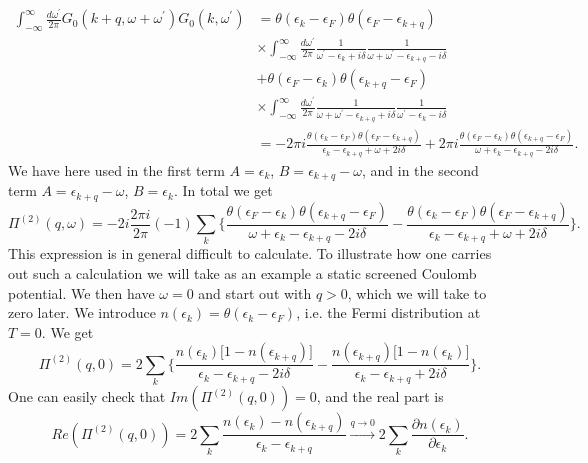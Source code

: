 \begin{align*}
\int_{-\infty}^{\infty}\frac{d\omega^{\prime}}{2\pi}G_0(k+q,\omega+\omega^{\prime})G_0(k,\omega^{\prime})&=\theta(\epsilon_k-\epsilon_F)\theta(\epsilon_F-\epsilon_{k+q})\\
&\times\int_{-\infty}^{\infty}\frac{d\omega^{\prime}}{2\pi}\frac{1}{\omega^{\prime}-\epsilon_k+i\delta}\frac{1}{\omega+\omega^{\prime}-\epsilon_{k+q}-i\delta}\\
&+\theta(\epsilon_F-\epsilon_k)\theta(\epsilon_{k+q}-\epsilon_F)\\
&\times\int_{-\infty}^{\infty}\frac{d\omega^{\prime}}{2\pi}\frac{1}{\omega+\omega^{\prime}-\epsilon_{k+q}+i\delta}\frac{1}{\omega^{\prime}-\epsilon_k-i\delta}\\
&=-2\pi i\frac{\theta(\epsilon_k-\epsilon_F)\theta(\epsilon_F-\epsilon_{k+q})}{\epsilon_k-\epsilon_{k+q}+\omega+2i\delta}+2\pi i\frac{\theta(\epsilon_F-\epsilon_k)\theta(\epsilon_{k+q}-\epsilon_F)}{\omega+\epsilon_k-\epsilon_{k+q}-2i\delta}.
\end{align*}
We have here used in the first term $A=\epsilon_k$, $B=\epsilon_{k+q}-\omega$, and in the second term $A=\epsilon_{k+q}-\omega$, $B=\epsilon_k$. In total we get
\begin{equation}
\Pi^{(2)}(q,\omega)=-2i\frac{2\pi i}{2\pi}(-1)\sum_{k}\{\frac{\theta(\epsilon_F-\epsilon_k)\theta(\epsilon_{k+q}-\epsilon_F)}{\omega+\epsilon_k-\epsilon_{k+q}-2i\delta}-\frac{\theta(\epsilon_k-\epsilon_F)\theta(\epsilon_F-\epsilon_{k+q})}{\epsilon_k-\epsilon_{k+q}+\omega+2i\delta}\}.
\end{equation}
This expression is in general difficult to calculate. To illustrate how one carries out such a calculation we will take as an example a static screened Coulomb potential. We then have $\omega=0$ and start out with $q>0$, which we will take to zero later. We introduce $n(\epsilon_k)=\theta(\epsilon_k-\epsilon_F)$, i.e. the Fermi distribution at $T=0$. We get
\begin{equation}
\Pi^{(2)}(q,0)=2\sum_k\{\frac{n(\epsilon_k)\big[1-n(\epsilon_{k+q})\big]}{\epsilon_k-\epsilon_{k+q}-2i\delta}-\frac{n(\epsilon_{k+q})\big[1-n(\epsilon_k)\big]}{\epsilon_k-\epsilon_{k+q}+2i\delta}\}.
\end{equation}
One can easily check that $Im(\Pi^{(2)}(q,0))=0$, and the real part is
\begin{equation}
Re(\Pi^{(2)}(q,0))=2\sum_k\frac{n(\epsilon_k)-n(\epsilon_{k+q})}{\epsilon_k-\epsilon_{k+q}}\stackrel{q\rightarrow 0}{\rightarrow}2\sum_k\frac{\partial n(\epsilon_k)}{\partial \epsilon_k}.
\end{equation}
